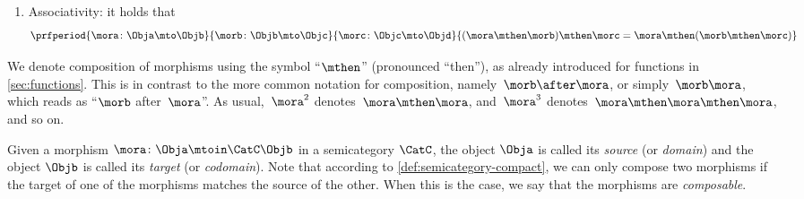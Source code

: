\begin{ctdefinition}[Semicategory]
\begin{body}
        \condit
        \begin{enumerate}
            \item Associativity: it holds that
                  \begin{equation}
                      \prfperiod{
                          \mora\colon \Obja \mto \Objb
                      }{
                          \morb\colon \Objb \mto \Objc
                      }{
                          \morc\colon \Objc \mto \Objd
                      }{
                          (\mora\mthen \morb)
                          \mthen \morc= \mora \mthen (\morb \mthen \morc)
                      }
                  \end{equation}
        \end{enumerate}
    \end{body}
\end{ctdefinition}

\begin{remark}
    We denote composition of morphisms using the symbol ``$\mthen$'' (pronounced ``then''), as already introduced for functions in \cref{sec:functions}.
    This is in contrast to the more common notation for composition, namely~$\morb\after \mora$, or simply~$\morb \mora$, which reads as ``$\morb$ after~$\mora$''.
    As usual,~$\mora^2$ denotes~$\mora \mthen \mora$, and~$\mora^3$ denotes~$\mora \mthen \mora \mthen \mora$, and so on.
\end{remark}

Given a morphism $\mora \colon \Obja \mtoin\CatC \Objb$ in a semicategory $\CatC$, the object $\Obja$ is called its \emph{source} (or \emph{domain}) and the object $\Objb$ is called its \emph{target} (or \emph{codomain}).
Note that according to \cref{def:semicategory-compact}, we can only compose two morphisms if the target of one of the morphisms matches the source of the other.
When this is the case, we say that the morphisms are \emph{composable}.


